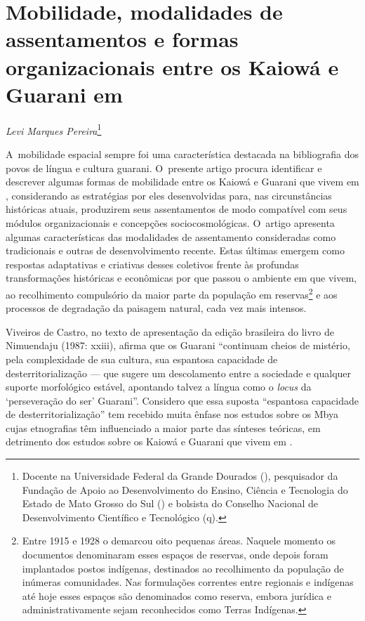 \chapter*{Mobilidade, modalidades de assentamentos e formas organizacionais entre
os Kaiowá e Guarani em }

\@openrighttrue\makeatother

\begin{flushright}
\emph{Levi Marques Pereira}\footnote{Docente na Universidade Federal da
Grande Dourados (), pesquisador da Fundação de Apoio ao Desenvolvimento do Ensino, Ciência e Tecnologia do Estado de Mato Grosso do Sul () e bolsista do Conselho Nacional de Desenvolvimento Científico e Tecnológico (q).} 
\end{flushright}

\noindent
A~mobilidade espacial sempre foi uma característica destacada na
bibliografia dos povos de língua e cultura guarani. O~presente artigo
procura identificar e descrever algumas formas de mobilidade entre os
Kaiowá e Guarani que vivem em , considerando as estratégias por eles
desenvolvidas para, nas circunstâncias históricas atuais, produzirem
seus assentamentos de modo compatível com seus módulos organizacionais
e concepções sociocosmológicas. O~artigo apresenta algumas
características das modalidades de assentamento consideradas como
tradicionais e outras de desenvolvimento recente. Estas últimas emergem
como respostas adaptativas e criativas desses coletivos frente às
profundas transformações históricas e econômicas por que passou o
ambiente em que vivem, ao recolhimento compulsório da maior parte da
população em reservas\footnote{Entre 1915 e 1928 o  demarcou oito
pequenas áreas. Naquele momento os documentos denominaram esses espaços
de reservas, onde depois foram implantados postos indígenas, destinados
ao recolhimento da população de inúmeras comunidades. Nas formulações
correntes entre regionais e indígenas até hoje esses espaços são
denominados como reserva, embora jurídica e administrativamente sejam
reconhecidos como Terras Indígenas.} e aos processos de degradação
da paisagem natural, cada vez mais intensos.

Viveiros de Castro, no texto de apresentação da edição brasileira do
livro de Nimuendaju (1987: xxiii), afirma que os Guarani ``continuam
cheios de mistério, pela complexidade de sua cultura, sua espantosa
capacidade de desterritorialização --- que sugere um descolamento entre a
sociedade e qualquer suporte morfológico estável, apontando talvez a
língua como o \emph{locus} da ‘perseveração do ser’ Guarani''. Considero que
essa suposta ``espantosa capacidade de desterritorialização'' tem
recebido muita ênfase nos estudos sobre os Mbya cujas etnografias têm
influenciado a maior parte das sínteses teóricas, em detrimento dos
estudos sobre os Kaiowá e Guarani que vivem em . 

